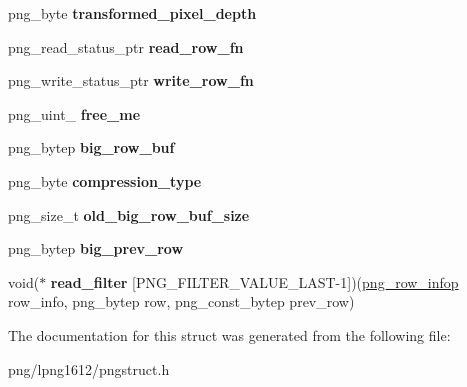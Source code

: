 \begin{DoxyCompactItemize}
\item 
\hypertarget{structpng__struct__def_aa4e37c14d96c7057389a7cb2ca839290}{png\+\_\+byte {\bfseries transformed\+\_\+pixel\+\_\+depth}}\label{structpng__struct__def_aa4e37c14d96c7057389a7cb2ca839290}

\item 
\hypertarget{structpng__struct__def_a0d67c044d4088f4673b90c2109ff94c0}{png\+\_\+read\+\_\+status\+\_\+ptr {\bfseries read\+\_\+row\+\_\+fn}}\label{structpng__struct__def_a0d67c044d4088f4673b90c2109ff94c0}

\item 
\hypertarget{structpng__struct__def_a1ea44e185e0f8bdd7299f93fd017c32c}{png\+\_\+write\+\_\+status\+\_\+ptr {\bfseries write\+\_\+row\+\_\+fn}}\label{structpng__struct__def_a1ea44e185e0f8bdd7299f93fd017c32c}

\item 
\hypertarget{structpng__struct__def_a610bea16ff780c149d2756b60d2e6087}{png\+\_\+uint\+\_ {\bfseries free\+\_\+me}}\label{structpng__struct__def_a610bea16ff780c149d2756b60d2e6087}

\item 
\hypertarget{structpng__struct__def_a7248deb9bb1525d1d16ee9d6187128b9}{png\+\_\+bytep {\bfseries big\+\_\+row\+\_\+buf}}\label{structpng__struct__def_a7248deb9bb1525d1d16ee9d6187128b9}

\item 
\hypertarget{structpng__struct__def_ad448c2648c447212ff66a0ec48cf1394}{png\+\_\+byte {\bfseries compression\+\_\+type}}\label{structpng__struct__def_ad448c2648c447212ff66a0ec48cf1394}

\item 
\hypertarget{structpng__struct__def_a42a732b3edf3c2fae816610beb949cc5}{png\+\_\+size\+\_\+t {\bfseries old\+\_\+big\+\_\+row\+\_\+buf\+\_\+size}}\label{structpng__struct__def_a42a732b3edf3c2fae816610beb949cc5}

\item 
\hypertarget{structpng__struct__def_a58ed983872249c948e063743eb18d427}{png\+\_\+bytep {\bfseries big\+\_\+prev\+\_\+row}}\label{structpng__struct__def_a58ed983872249c948e063743eb18d427}

\item 
\hypertarget{structpng__struct__def_a669016ed081452035d16f3a93740d663}{void($\ast$ {\bfseries read\+\_\+filter} \mbox{[}P\+N\+G\+\_\+\+F\+I\+L\+T\+E\+R\+\_\+\+V\+A\+L\+U\+E\+\_\+\+L\+A\+S\+T-\/1\mbox{]})(\hyperlink{structpng__row__info__struct}{png\+\_\+row\+\_\+infop} row\+\_\+info, png\+\_\+bytep row, png\+\_\+const\+\_\+bytep prev\+\_\+row)}\label{structpng__struct__def_a669016ed081452035d16f3a93740d663}

\end{DoxyCompactItemize}


The documentation for this struct was generated from the following file\+:\begin{DoxyCompactItemize}
\item 
png/lpng1612/pngstruct.\+h\end{DoxyCompactItemize}
